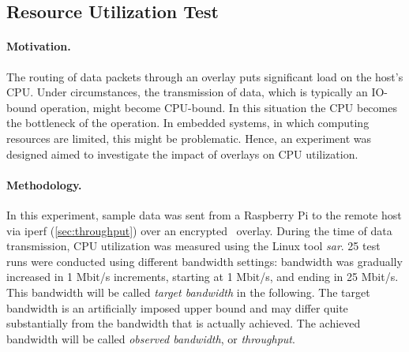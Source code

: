 \subsection{Resource Utilization Test} \label{sec:utilization}
\paragraph{Motivation.} The routing of data packets through an overlay puts significant load on the host's CPU. Under circumstances, the transmission of data, which is typically an IO-bound operation, might become CPU-bound. In this situation the CPU becomes the bottleneck of the operation. In embedded systems, in which computing resources are limited, this might be problematic. Hence, an experiment was designed aimed to investigate the impact of overlays on CPU utilization.

\paragraph{Methodology.} In this experiment, sample data was sent from a Raspberry Pi to the remote host via iperf (\cf \autoref{sec:throughput}) over an encrypted \wnet\ overlay. During the time of data transmission, CPU utilization was measured using the Linux tool \emph{sar}. 25 test runs were conducted using different bandwidth settings: bandwidth was gradually increased in 1 Mbit/s increments, starting at 1 Mbit/s, and ending in 25 Mbit/s. This bandwidth will be called \emph{target bandwidth} in the following. The target bandwidth is an artificially imposed upper bound and may differ quite substantially from the bandwidth that is actually achieved. The achieved bandwidth will be called \emph{observed bandwidth}, or \emph{throughput}.

